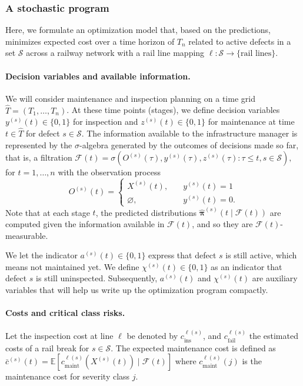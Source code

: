 \subsubsection{A stochastic program}
Here, we formulate an optimization model that, based on the predictions, minimizes expected cost over a time horizon of $T_n$ related to active defects in a set $\mathcal{S}$ across a railway network with a rail line mapping $\ell:\mathcal{S}\to\{\text{rail lines}\}$.


\paragraph{Decision variables and available information.}
We will consider maintenance and inspection planning on a time grid $\widehat T=(T_1,\dots,T_n)$.
At these time points (stages), we define decision variables 
$y^{(s)}(t)\in\{0,1\}$ for inspection and $z^{(s)}(t)\in\{0,1\}$ for maintenance at time $t \in \widehat T$ for defect $s\in\mathcal S$.
The information available to the infrastructure manager is represented by the $\sigma$-algebra generated by the outcomes of decisions made so far, that is, a filtration
$
\mathcal F(t) = \sigma \left( O^{(s)}(\tau), y^{(s)}(\tau), z^{(s)}(\tau) : \tau \leq t, s\in\mathcal S \right), 
$
for $t = 1, \dots, n$ with the observation process 
$$
O^{(s)}(t) = \begin{cases}
X^{(s)}(t), \quad &y^{(s)}(t) = 1\\ 
\varnothing, \quad &y^{(s)}(t) = 0.
\end{cases}
$$
Note that at each stage $t$, the predicted distributions $\widehat{\bm \pi}^{(s)}(t \mid \mathcal F(t))$ are computed given the information available in $\mathcal F(t)$, and so they are $\mathcal F(t)$-measurable.

We let the indicator \(a^{(s)}(t)\in\{0,1\}\) express that defect \(s\) is still active, which means not maintained yet. We define \(\chi^{(s)}(t)\in\{0,1\}\) as an indicator that defect \(s\) is still uninspected. Subsequently, $a^{(s)}(t)$ and $\chi^{(s)}(t)$ are auxiliary variables that will help us write up the optimization program compactly.


\paragraph{Costs and critical class risks.}
Let the inspection cost at line $\ell$ be denoted by $c_{\text{ins}}^{\ell(s)}$, and $c_{\text{fail}}^{\ell(s)}$ the estimated costs of a rail break for $s \in \mathcal S$.
The expected maintenance cost is defined as 
$
\bar c^{(s)}(t) = \mathds E \left[ c_{\text{maint}}^{\ell(s)} \left(X^{(s)}(t)\right) \mid \mathcal F(t) \right]
$ where $c^{\ell(s)}_{\text{maint}}(j)$ is the maintenance cost for severity class $j$.

